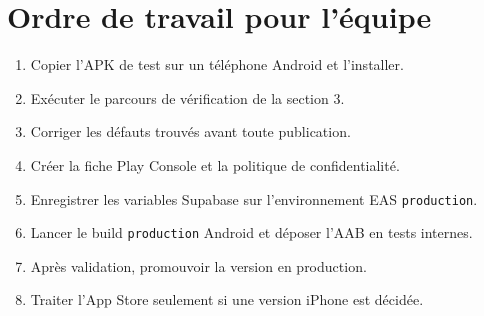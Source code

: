 \documentclass[11pt,a4paper]{article}
\newcommand{\code}[1]{\texttt{#1}}
\begin{document}
\section{Ordre de travail pour l'équipe}

\begin{enumerate}
  \item Copier l'APK de test sur un téléphone Android et l'installer.
  \item Exécuter le parcours de vérification de la section 3.
  \item Corriger les défauts trouvés avant toute publication.
  \item Créer la fiche Play Console et la politique de confidentialité.
  \item Enregistrer les variables Supabase sur l'environnement EAS \code{production}.
  \item Lancer le build \code{production} Android et déposer l'AAB en tests internes.
  \item Après validation, promouvoir la version en production.
  \item Traiter l'App Store seulement si une version iPhone est décidée.
\end{enumerate}
\end{document}
